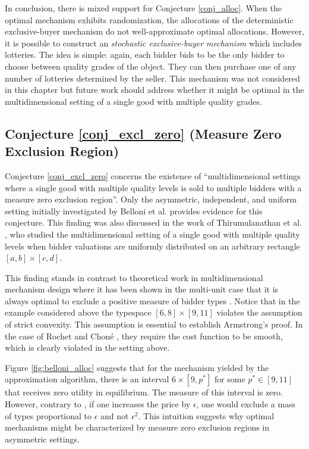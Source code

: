 In conclusion, there is mixed support for Conjecture \ref{conj_alloc}. When the optimal mechanism exhibits randomization, the allocations of the deterministic exclusive-buyer mechanism do not well-approximate optimal allocations. However, it is possible to construct an \textit{stochastic exclusive-buyer mechanism} which includes lotteries. The idea is simple: again, each bidder bids to be the only bidder to choose between quality grades of the object. They can then purchase one of any number of lotteries determined by the seller. This mechanism was not considered in this chapter but future work should address whether it might be optimal in the multidimensional setting of a single good with multiple quality grades.





\subsection{Conjecture \ref{conj_excl_zero} (Measure Zero Exclusion Region)}

Conjecture \ref{conj_excl_zero} concerns the existence of ``multidimensional settings where a single good with multiple quality levels is sold to multiple bidders with a measure zero exclusion region''. Only the asymmetric, independent, and uniform setting initially investigated by Belloni et al. \autocite*{belloni2010multidimensional} provides evidence for this conjecture. This finding was also discussed in the work of Thirumulanathan et al. \autocite*{thirumulanathan2019unitdemand}, who studied the multidimensional setting of a single good with multiple quality levels when bidder valuations are uniformly distributed on an arbitrary rectangle $[a,b] \times [c,d]$. 

This finding stands in contrast to theoretical work in multidimensional mechanism design where it has been shown in the multi-unit case that it is always optimal to exclude a positive measure of bidder types \autocite{armstrong1996multiproduct,rochet1998ironing}. Notice that in the example considered above the typespace $[6,8]\times[9,11]$ violates the assumption of strict convexity. This assumption is essential to establish Armstrong's \autocite*{armstrong1996multiproduct} proof. In the case of Rochet and Choné \autocite*{rochet1998ironing}, they require the cost function to be smooth, which is clearly violated in the setting above.

Figure \ref{fig:belloni_alloc} suggests that for the mechanism yielded by the approximation algorithm, there is an interval $6\times [9,p^*]$ for some $p^*\in [9,11]$ that receives zero utility in equilibrium. The measure of this interval is zero. However, contrary to \autocite[Proposition 1]{armstrong1996multiproduct}, if one increases the price by $\epsilon$, one would exclude a mass of types proportional to $\epsilon$ and not $\epsilon^2$. This intuition suggests why optimal mechanisms might be characterized by measure zero exclusion regions in asymmetric settings. 





